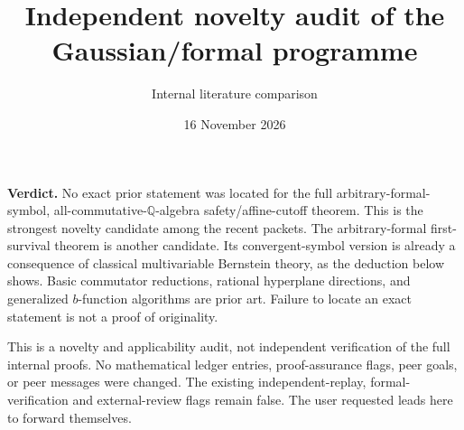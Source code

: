 \documentclass[11pt]{article}
\title{Independent novelty audit of the Gaussian/formal programme}
\author{Internal literature comparison}
\date{16 November 2026}
\begin{document}
\maketitle

\noindent\textbf{Verdict.} No exact prior statement was located for the full arbitrary-formal-symbol, all-commutative-$\mathbb Q$-algebra safety/affine-cutoff theorem. This is the strongest novelty candidate among the recent packets. The arbitrary-formal first-survival theorem is another candidate. Its convergent-symbol version is already a consequence of classical multivariable Bernstein theory, as the deduction below shows. Basic commutator reductions, rational hyperplane directions, and generalized $b$-function algorithms are prior art. Failure to locate an exact statement is not a proof of originality.

This is a novelty and applicability audit, not independent verification of the full internal proofs. No mathematical ledger entries, proof-assurance flags, peer goals, or peer messages were changed. The existing independent-replay, formal-verification and external-review flags remain false. The user requested leads here to forward themselves.
\end{document}
